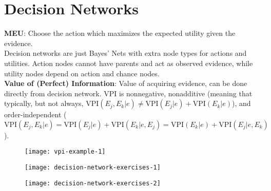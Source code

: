 \section{Decision Networks}
\textbf{MEU}: Choose the action which maximizes the expected utility given the evidence. \\
Decision networks are just Bayes' Nets with extra node types for actions and utilities. Action nodes cannot have parents and act as observed evidence, while utility nodes depend on action and chance nodes. \\
\textbf{Value of (Perfect) Information}: Value of acquiring evidence, can be done directly from decision network. VPI is nonnegative, nonadditive (meaning that typically, but not always, $\text{VPI}(E_j,E_k|e)\neq\text{VPI}(E_j|e)+\text{VPI}(E_k|e)$), and order-independent ($\text{VPI}(E_j,E_k|e)=\text{VPI}(E_j|e)+\text{VPI}(E_k|e,E_j)=\text{VPI}(E_k|e)+\text{VPI}(E_j|e,E_k)$).
\begin{figure}[H]
\centering
\texttt{[image: vpi-example-1]}
\end{figure}
\begin{figure}[H]
\centering
\texttt{[image: decision-network-exercises-1]}
\end{figure}
\begin{figure}[H]
\centering
\texttt{[image: decision-network-exercises-2]}
\end{figure}